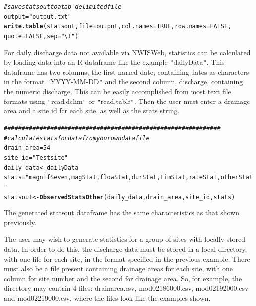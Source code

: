 \documentclass[a4paper,11pt]{article}\usepackage[]{graphicx}\usepackage[]{color}
\makeatletter
\newcommand{\hlnum}[1]{\textcolor[rgb]{0.686,0.059,0.569}{#1}}%
\newcommand{\hlstr}[1]{\textcolor[rgb]{0.192,0.494,0.8}{#1}}%
\newcommand{\hlcom}[1]{\textcolor[rgb]{0.678,0.584,0.686}{\textit{#1}}}%
\newcommand{\hlstd}[1]{\textcolor[rgb]{0.345,0.345,0.345}{#1}}%
\newcommand{\hlkwb}[1]{\textcolor[rgb]{0.69,0.353,0.396}{#1}}%
\newcommand{\hlkwc}[1]{\textcolor[rgb]{0.333,0.667,0.333}{#1}}%
\newcommand{\hlkwd}[1]{\textcolor[rgb]{0.737,0.353,0.396}{\textbf{#1}}}%
\newenvironment{kframe}{%
 \def\at@end@of@kframe{}%
 \ifinner\ifhmode%
  \def\at@end@of@kframe{\end{minipage}}%
  \begin{minipage}{\columnwidth}%
 \fi\fi%
 \def\FrameCommand##1{\hskip\@totalleftmargin \hskip-\fboxsep
 \colorbox{shadecolor}{##1}\hskip-\fboxsep
     \hskip-\linewidth \hskip-\@totalleftmargin \hskip\columnwidth}%
 \MakeFramed {\advance\hsize-\width
   \@totalleftmargin\z@ \linewidth\hsize
   \@setminipage}}%
 {\par\unskip\endMakeFramed%
 \at@end@of@kframe}
\newenvironment{knitrout}{}{} %
\makeatother
\begin{document}
\begin{knitrout}
\color{fgcolor}\begin{kframe}
\begin{alltt}
\hlcom{# save statsout to a tab-delimited file}
\hlstd{output} \hlkwb{=} \hlstr{"output.txt"}
\hlkwd{write.table}\hlstd{(statsout,} \hlkwc{file} \hlstd{= output,} \hlkwc{col.names} \hlstd{=} \hlnum{TRUE}\hlstd{,} \hlkwc{row.names} \hlstd{=} \hlnum{FALSE}\hlstd{,}
            \hlkwc{quote} \hlstd{=} \hlnum{FALSE}\hlstd{,} \hlkwc{sep} \hlstd{=} \hlstr{"\textbackslash{}t"}\hlstd{)}
\end{alltt}
\end{kframe}
\end{knitrout}

For daily discharge data not available via NWISWeb, statistics can be calculated by loading data into an R dataframe like the example \texttt{"}dailyData\texttt{"}. This dataframe has two columns, the first named date, containing dates as characters in the format \texttt{"}YYYY-MM-DD\texttt{"} and the second column, discharge, containing the numeric discharge. This can be easily accomplished from most text file formats using \texttt{"}read.delim\texttt{"} or \texttt{"}read.table\texttt{"}. Then the user must enter a drainage area and a site id for each site, as well as the stats string.

\begin{knitrout}
\color{fgcolor}\begin{kframe}
\begin{alltt}
\hlcom{#############################################################}
\hlcom{# calculate stats for data from your own data file}
\hlstd{drain_area}\hlkwb{=}\hlnum{54}
\hlstd{site_id}\hlkwb{=}\hlstr{"Test site"}
\hlstd{daily_data}\hlkwb{<-}\hlstd{dailyData}
\hlstd{stats}\hlkwb{=}\hlstr{"magnifSeven,magStat,flowStat,durStat,timStat,rateStat,otherStat"}
\hlstd{statsout} \hlkwb{<-} \hlkwd{ObservedStatsOther}\hlstd{(daily_data,drain_area,site_id,stats)}
\end{alltt}
\end{kframe}
\end{knitrout}

The generated statsout dataframe has the same characteristics as that shown previously. 

The user may wish to generate statistics for a group of sites with locally-stored data. In order to do this, the discharge data must be stored in a local directory, with one file for each site, in the format specified in the previous example. There must also be a file present containing drainage areas for each site, with one column for site number and the second for drainage area. So, for example, the directory may contain 4 files: drainarea.csv, mod02186000.csv, mod02192000.csv and mod02219000.csv, where the files look like the examples shown. 
\end{document}
